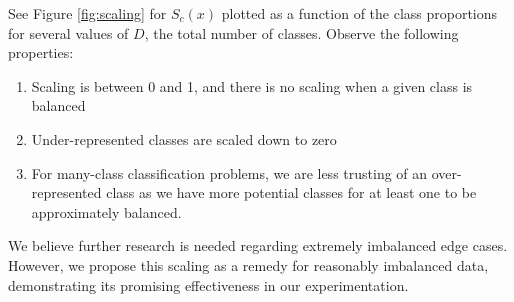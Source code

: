 \documentclass{article} %
\begin{document}
See Figure \ref{fig:scaling} for $S_c(x)$ plotted as a function of the class proportions for several values of $D$, the total number of classes. Observe the following  properties:
\begin{enumerate}
    \item Scaling is between 0 and 1, and there is no scaling when a given class is balanced
    \item Under-represented classes are scaled down to zero
    \item For many-class classification problems, we are less trusting of an over-represented class as we have more potential classes for at least one to be approximately balanced.
\end{enumerate}

We believe further research is needed regarding extremely imbalanced edge cases. However, we propose this scaling as a remedy for reasonably imbalanced data, demonstrating its promising effectiveness in our experimentation.
\end{document}
